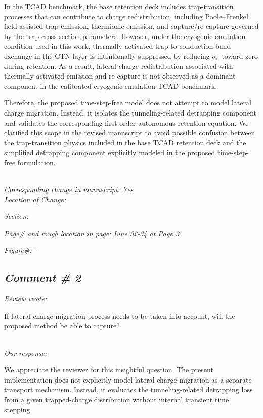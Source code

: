 \documentclass[11pt]{article}
\begin{document}
In the TCAD benchmark, the base retention deck includes trap-transition processes that can contribute to charge redistribution, including Poole--Frenkel field-assisted trap emission, thermionic emission, and capture/re-capture governed by the trap cross-section parameters.
However, under the cryogenic-emulation condition used in this work, thermally activated trap-to-conduction-band exchange in the CTN layer is intentionally suppressed by reducing $\sigma_\mathrm{n}$ toward zero during retention.
As a result, lateral charge redistribution associated with thermally activated emission and re-capture is not observed as a dominant component in the calibrated cryogenic-emulation TCAD benchmark.

Therefore, the proposed time-step-free model does not attempt to model lateral charge migration.
Instead, it isolates the tunneling-related detrapping component and validates the corresponding first-order autonomous retention equation.
We clarified this scope in the revised manuscript to avoid possible confusion between the trap-transition physics included in the base TCAD retention deck and the simplified detrapping component explicitly modeled in the proposed time-step-free formulation.

\noindent \textit{\\Corresponding change in manuscript: Yes \\Location of Change:}

\hspace{40pt} \noindent \textit{Section: \uppercase\expandafter{}}

\hspace{40pt} \noindent \textit{Page\# and rough location in page: Line 32-34 at Page 3}

\hspace{40pt} \noindent \textit{Figure\#: - }

\subsection*{\textit{Comment \# 2}}

\noindent \textit{Review wrote: }

If lateral charge migration process needs to be taken into account, will the proposed method be able to capture?

\noindent \textit{\\Our response: }

We appreciate the reviewer for this insightful question.
The present implementation does not explicitly model lateral charge migration as a separate transport mechanism.
Instead, it evaluates the tunneling-related detrapping loss from a given trapped-charge distribution without internal transient time stepping.
\end{document}
